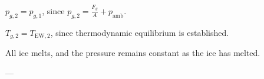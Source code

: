 \( p_{g,2} = p_{g,1} \), since \( p_{g,2} = \frac{F_g}{A} + p_{\text{amb}} \).  

\( T_{g,2} = T_{\text{EW},2} \), since thermodynamic equilibrium is established.  

All ice melts, and the pressure remains constant as the ice has melted.  

---